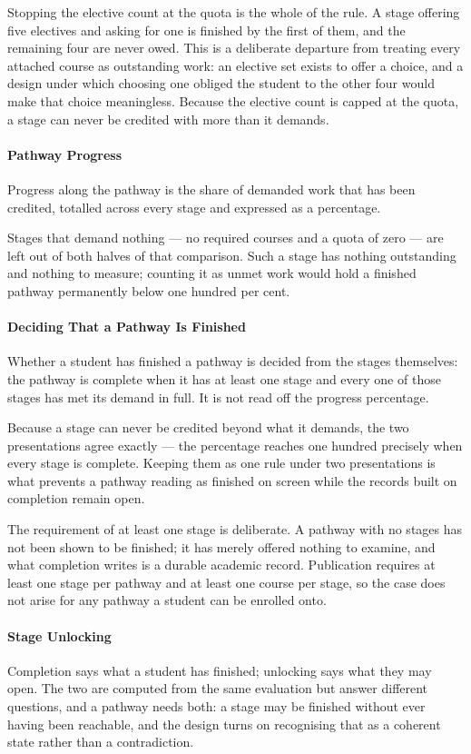 Stopping the elective count at the quota is the whole of the rule. A stage
offering five electives and asking for one is finished by the first of them,
and the remaining four are never owed. This is a deliberate departure from
treating every attached course as outstanding work: an elective set exists to
offer a choice, and a design under which choosing one obliged the student to
the other four would make that choice meaningless. Because the elective count
is capped at the quota, a stage can never be credited with more than it
demands.

\paragraph{Pathway Progress}
Progress along the pathway is the share of demanded work that has been
credited, totalled across every stage and expressed as a percentage.

Stages that demand nothing --- no required courses and a quota of zero --- are
left out of both halves of that comparison. Such a stage has nothing
outstanding and nothing to measure; counting it as unmet work would hold a
finished pathway permanently below one hundred per cent.

\paragraph{Deciding That a Pathway Is Finished}
Whether a student has finished a pathway is decided from the stages
themselves: the pathway is complete when it has at least one stage and every
one of those stages has met its demand in full. It is not read off the
progress percentage.

Because a stage can never be credited beyond what it demands, the two
presentations agree exactly --- the percentage reaches one hundred precisely
when every stage is complete. Keeping them as one rule under two presentations
is what prevents a pathway reading as finished on screen while the records
built on completion remain open.

The requirement of at least one stage is deliberate. A pathway with no stages
has not been shown to be finished; it has merely offered nothing to examine,
and what completion writes is a durable academic record. Publication requires
at least one stage per pathway and at least one course per stage, so the case
does not arise for any pathway a student can be enrolled onto.

\paragraph{Stage Unlocking}
Completion says what a student has finished; unlocking says what they may
open. The two are computed from the same evaluation but answer different
questions, and a pathway needs both: a stage may be finished without ever
having been reachable, and the design turns on recognising that as a coherent
state rather than a contradiction.

